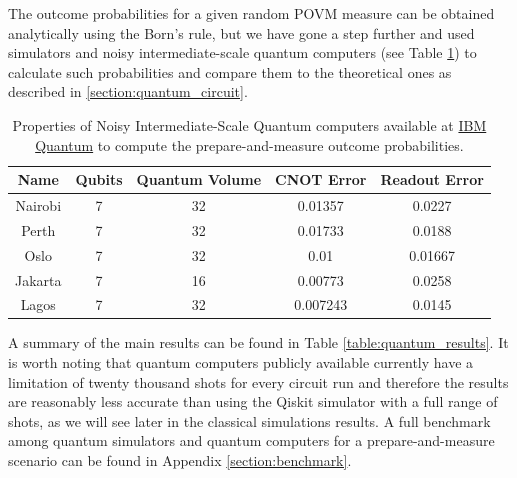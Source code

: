 The outcome probabilities for a given random POVM measure can be obtained analytically using the Born's rule, but we have gone a step further and used simulators and noisy intermediate-scale quantum computers (see Table \ref{table:quantum_resources}) to calculate such probabilities and compare them to the theoretical ones as described in \ref{section:quantum_circuit}. 
\newline
\begin{table}[h!]
\centering
\begin{tabular}{c c c c c} 
 \toprule
 Name & Qubits & Quantum Volume & CNOT Error & Readout Error \\ [1ex] 
 \midrule
 Nairobi & 7 & 32 & 0.01357 & 0.0227 \\ 
 Perth & 7 & 32 & 0.01733 & 0.0188 \\
 Oslo & 7 & 32 & 0.01 & 0.01667 \\
 Jakarta & 7 & 16 & 0.00773 & 0.0258 \\
 Lagos & 7 & 32 & 0.007243 & 0.0145 \\ 
 \bottomrule
\end{tabular}
\caption{Properties of Noisy Intermediate-Scale Quantum computers available at \href{https://quantum-computing.ibm.com}{IBM Quantum} to compute the prepare-and-measure outcome probabilities.}
\label{table:quantum_resources}
\end{table}

A summary of the main results can be found in Table \ref{table:quantum_results}. It is worth noting that quantum computers publicly available currently have a limitation of twenty thousand shots for every circuit run and therefore the results are reasonably less accurate than using the Qiskit simulator with a full range of shots, as we will see later in the classical simulations results. A full benchmark among quantum simulators and quantum computers for a prepare-and-measure scenario can be found in Appendix \ref{section:benchmark}.


